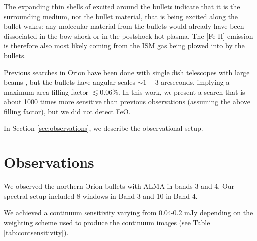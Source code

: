 \documentclass[twocolumn]{aastex61}
\begin{document}
The expanding thin shells of excited \hh around the bullets indicate that it is
the surrounding medium, not the bullet material, that is being excited along
the bullet wakes: any molecular material from the bullets would already have
been dissociated in the bow shock or in the postshock hot plasma.  The [Fe II]
emission is therefore also most likely coming from the ISM gas being plowed
into by the bullets.  

Previous searches in Orion have been done with single dish telescopes with
large beams \citep[40\arcsec;][]{Merer1982a}, but the bullets have angular
scales $\sim1-3$ arcseconds, implying a maximum area filling factor
$\lesssim0.06\%$.  In this work, we present a search that is about 1000 times more
sensitive than previous observations (assuming the above filling factor),
but we did not detect FeO.

In Section \ref{sec:observations}, we describe the observational setup.


\section{Observations}

We observed the northern Orion bullets with ALMA in bands 3 and 4.
Our spectral setup included 8 windows in Band 3 and 10 in Band 4.


We achieved a continuum sensitivity varying from 0.04-0.2 mJy depending on the
weighting scheme used to produce the continuum images (see Table
\ref{tab:contsensitivity}).






\end{document}
